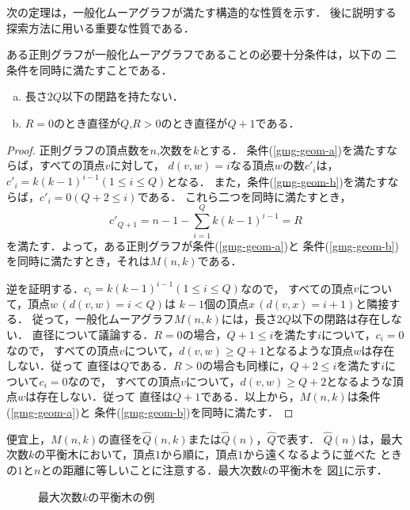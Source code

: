 次の定理は，一般化ムーアグラフが満たす構造的な性質を示す．
後に説明する探索方法に用いる重要な性質である．
\begin{theorem}\rm
  \label{thm:gmg-geometric-property}
  ある正則グラフが一般化ムーアグラフであることの必要十分条件は，以下の
  二条件を同時に満たすことである．
  \begin{enumerate}[(a)]
  \item 長さ$2Q$以下の閉路を持たない．
    \label{gmg-geom-a}
  \item $R=0$のとき直径が$Q$,\hspace{2ex}$R>0$のとき直径が$Q+1$である．
    \label{gmg-geom-b}
  \end{enumerate}
\end{theorem}
\begin{proof}\rm
  正則グラフの頂点数を$n$,次数を$k$とする．
  条件(\ref{gmg-geom-a})を満たすならば，すべての頂点$v$に対して，
  $d(v,w)=i$なる頂点$w$の数$c'_i$は，$c'_i=k(k-1)^{i-1}(1\leq i\leq Q)$となる．
  また，条件(\ref{gmg-geom-b})を満たすならば，$c'_i=0(Q+2\leq i)$である．
  これら二つを同時に満たすとき，
  \[ c'_{Q+1}=n-1-\sum_{i=1}^{Q}k(k-1)^{i-1}=R \]
  を満たす．よって，ある正則グラフが条件(\ref{gmg-geom-a})と
  条件(\ref{gmg-geom-b})を同時に満たすとき，それは$M(n,k)$である．

  逆を証明する．$c_i=k(k-1)^{i-1}(1\leq i\leq Q)$なので，
  すべての頂点$v$について，頂点$w\,(d(v,w)=i<Q)$は
  $k-1$個の頂点$x\,(d(v,x)=i+1)$と隣接する．
  従って，一般化ムーアグラフ$M(n,k)$には，長さ$2Q$以下の閉路は存在しない．
  直径について議論する．$R=0$の場合，$Q+1\leq i$を満たす$i$について，$c_i=0$なので，
  すべての頂点$v$について，$d(v,w)\geq Q+1$となるような頂点$w$は存在しない．従って
  直径は$Q$である．$R>0$の場合も同様に，$Q+2\leq i$を満たす$i$について$c_i=0$なので，
  すべての頂点$v$について，$d(v,w)\geq Q+2$となるような頂点$w$は存在しない．従って
  直径は$Q+1$である．以上から，$M(n,k)$は条件(\ref{gmg-geom-a})と
  条件(\ref{gmg-geom-b})を同時に満たす．
\end{proof}

便宜上，$M(n,k)$の直径を$\hat{Q}(n,k)$または$\hat{Q}(n)$，$\hat{Q}$で表す．
$\hat{Q}(n)$は，最大次数$k$の平衡木において，頂点$1$から順に，頂点$1$から遠くなるように並べた
ときの$1$と$n$との距離に等しいことに注意する．最大次数$k$の平衡木を
図\ref{fig:balanced-tree}に示す．
\begin{figure}
  \centering
  \def\svgwidth{.4\textwidth}
  
  \caption{最大次数$k$の平衡木の例}
  \label{fig:balanced-tree}
\end{figure}

